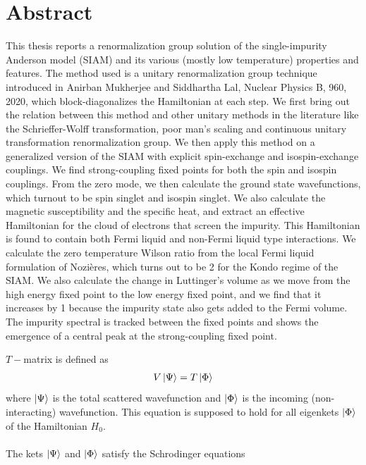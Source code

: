 \documentclass[twoside]{report}
\numberwithin{equation}{section}
\begin{document}
\chapter*{Abstract}
This thesis reports a renormalization group solution of the single-impurity Anderson model (SIAM) and its various (mostly low temperature) properties and features. The method used is a unitary renormalization group technique introduced in Anirban Mukherjee and Siddhartha Lal, Nuclear Physics B, 960, 2020, which block-diagonalizes the Hamiltonian at each step. We first bring out the relation between this method and other unitary methods in the literature like the Schrieffer-Wolff transformation, poor man's scaling and continuous unitary transformation renormalization group. We then apply this method on a generalized version of the SIAM with explicit spin-exchange and isospin-exchange couplings. We find strong-coupling fixed points for both the spin and isospin couplings. From the zero mode, we then calculate the ground state wavefunctions, which turnout to be spin singlet and isospin singlet. We also calculate the magnetic susceptibility and the specific heat, and extract an effective Hamiltonian for the cloud of electrons that screen the impurity. This Hamiltonian is found to contain both Fermi liquid and non-Fermi liquid type interactions. We calculate the zero temperature Wilson ratio from the local Fermi liquid formulation of Nozières, which turns out to be 2 for the Kondo regime of the SIAM. We also calculate the change in Luttinger's volume as we move from the high energy fixed point to the low energy fixed point, and we find that it increases by 1 because the impurity state also gets added to the Fermi volume. The impurity spectral is tracked between the fixed points and shows the emergence of a central peak at the strong-coupling fixed point.
\listoffigures
\listoftables
\tableofcontents
\pagebreak
{}
\(T-\)matrix is defined as\cite{sakurai}
\begin{equation}\begin{aligned}
\label{Tmatdef}
V\ket{\Psi} = T\ket{\Phi}
\end{aligned}\end{equation}
where \(\ket{\Psi}\) is the total scattered wavefunction and \(\ket{\Phi}\) is the incoming (non-interacting) wavefunction. This equation is supposed to hold for all eigenkets \(\ket{\Phi}\) of the Hamiltonian \(H_0\). 
\\\\The kets \(\ket{\Psi}\) and \(\ket{\Phi}\) satisfy the Schrodinger equations
\end{document}
